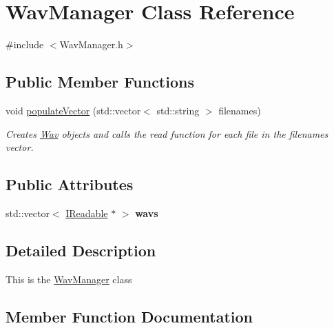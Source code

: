 \hypertarget{classWavManager}{}\section{Wav\+Manager Class Reference}
\label{classWavManager}


{\ttfamily \#include $<$Wav\+Manager.\+h$>$}

\subsection*{Public Member Functions}
\begin{DoxyCompactItemize}
\item 
void \hyperlink{classWavManager_ad777fbcc1b1fb7185c66d69a66842e02}{populate\+Vector} (std\+::vector$<$ std\+::string $>$ filenames)
\begin{DoxyCompactList}\small\item\em Creates \hyperlink{classWav}{Wav} objects and calls the read function for each file in the filenames vector. \end{DoxyCompactList}\end{DoxyCompactItemize}
\subsection*{Public Attributes}
\begin{DoxyCompactItemize}
\item 
\mbox{\label{classWavManager_aa12134771083da849053d1d5a6372d65}} 
std\+::vector$<$ \hyperlink{classIReadable}{I\+Readable} $\ast$ $>$ {\bfseries wavs}
\end{DoxyCompactItemize}


\subsection{Detailed Description}
This is the \hyperlink{classWavManager}{Wav\+Manager} class 

\subsection{Member Function Documentation}
\mbox{\label{classWavManager_ad777fbcc1b1fb7185c66d69a66842e02}} 
